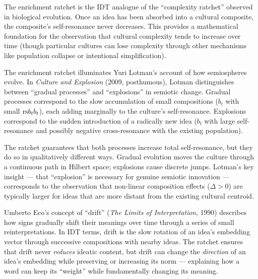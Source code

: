 \begin{interpretation}
The enrichment ratchet is the IDT analogue of the ``complexity ratchet''
observed in biological evolution.  Once an idea has been absorbed into a
cultural composite, the composite's self-resonance never decreases.  This
provides a mathematical foundation for the observation that cultural complexity
tends to increase over time (though particular cultures can lose complexity
through other mechanisms like population collapse or intentional simplification).
\end{interpretation}

\begin{interpretation}
\label{interp:ch17:lotman_semiosphere_evolution}
The enrichment ratchet illuminates Yuri Lotman's account of how semiospheres
evolve.  In \textit{Culture and Explosion} (2009, posthumous), Lotman
distinguishes between ``gradual processes'' and ``explosions'' in semiotic
change.  Gradual processes correspond to the slow accumulation of small
compositions ($b_t$ with small $\mathrm{rs}{b_t}{b_t}$), each adding marginally to
the culture's self-resonance.  Explosions correspond to the sudden
introduction of a radically new idea ($b_t$ with large self-resonance and
possibly negative cross-resonance with the existing population).

The ratchet guarantees that both processes increase total self-resonance,
but they do so in qualitatively different ways.  Gradual evolution moves
the culture through a continuous path in Hilbert space; explosions cause
discrete jumps.  Lotman's key insight --- that ``explosion'' is necessary
for genuine semiotic innovation --- corresponds to the observation that
non-linear composition effects ($\Delta > 0$) are typically larger for
ideas that are more distant from the existing cultural centroid.

Umberto Eco's concept of ``drift'' (\textit{The Limits of Interpretation},
1990) describes how signs gradually shift their meanings over time through
a series of small reinterpretations.  In IDT terms, drift is the
slow rotation of an idea's embedding vector through successive compositions
with nearby ideas.  The ratchet ensures that drift never \emph{reduces}
ideatic content, but drift can change the \emph{direction} of an idea's
embedding while preserving or increasing its norm --- explaining how
a word can keep its ``weight'' while fundamentally changing its meaning.
\end{interpretation}


